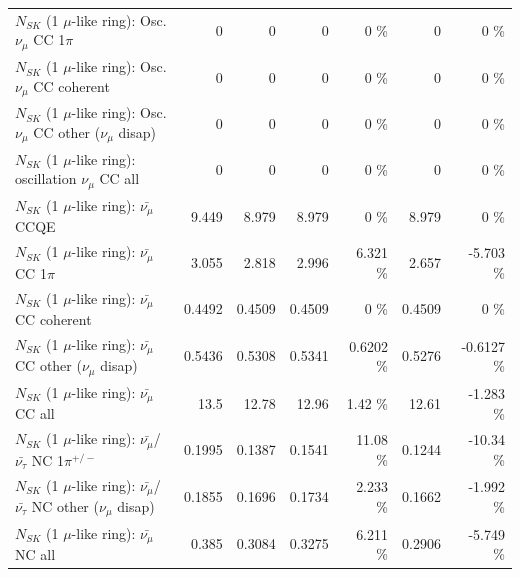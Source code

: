 \begin{table}
\begin{tabular}{| l | r | r | r  r | r  r |}
                          $N_{SK}$ (1 $\mu$-like ring): Osc. $\nu_\mu$ CC 1$\pi$ &               0 &               0 &               0 &        0 \%  &               0 &        0 \%  \\ 
                        $N_{SK}$ (1 $\mu$-like ring): Osc. $\nu_\mu$ CC coherent &               0 &               0 &               0 &        0 \%  &               0 &        0 \%  \\ 
         $N_{SK}$ (1 $\mu$-like ring): Osc. $\nu_\mu$ CC other ($\nu_\mu$ disap) &               0 &               0 &               0 &        0 \%  &               0 &        0 \%  \\ 
                      $N_{SK}$ (1 $\mu$-like ring): oscillation $\nu_\mu$ CC all &               0 &               0 &               0 &        0 \%  &               0 &        0 \%  \\ 
\hline
\hline
                              $N_{SK}$ (1 $\mu$-like ring): $\bar{\nu_\mu}$ CCQE &           9.449 &           8.979 &           8.979 &        0 \%  &           8.979 &        0 \%  \\ 
                         $N_{SK}$ (1 $\mu$-like ring): $\bar{\nu_\mu}$ CC 1$\pi$ &           3.055 &           2.818 &           2.996 &    6.321 \%  &           2.657 &   -5.703 \%  \\ 
                       $N_{SK}$ (1 $\mu$-like ring): $\bar{\nu_\mu}$ CC coherent &          0.4492 &          0.4509 &          0.4509 &        0 \%  &          0.4509 &        0 \%  \\ 
        $N_{SK}$ (1 $\mu$-like ring): $\bar{\nu_\mu}$ CC other ($\nu_\mu$ disap) &          0.5436 &          0.5308 &          0.5341 &   0.6202 \%  &          0.5276 &  -0.6127 \%  \\ 
                          $N_{SK}$ (1 $\mu$-like ring): $\bar{\nu_{\mu}}$ CC all &            13.5 &           12.78 &           12.96 &     1.42 \%  &           12.61 &   -1.283 \%  \\ 
\hline
  $N_{SK}$ (1 $\mu$-like ring): $\bar{\nu_\mu}$/$\bar{\nu_\tau}$ NC 1$\pi^{+/-}$ &          0.1995 &          0.1387 &          0.1541 &    11.08 \%  &          0.1244 &   -10.34 \%  \\ 
$N_{SK}$ (1 $\mu$-like ring): $\bar{\nu_\mu}$/$\bar{\nu_\tau}$ NC other ($\nu_\mu$ disap) &          0.1855 &          0.1696 &          0.1734 &    2.233 \%  &          0.1662 &   -1.992 \%  \\ 
                          $N_{SK}$ (1 $\mu$-like ring): $\bar{\nu_{\mu}}$ NC all &           0.385 &          0.3084 &          0.3275 &    6.211 \%  &          0.2906 &   -5.749 \%  \\ 

\end{tabular}
\end{table}
